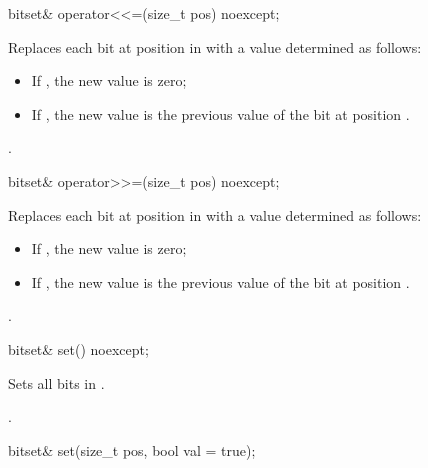 %
\begin{itemdecl}
bitset& operator<<=(size_t pos) noexcept;
\end{itemdecl}

\begin{itemdescr}
\pnum
\effects
Replaces each bit at position  in
with a value determined as follows:
\begin{itemize}
\item
If , the new value is zero;
\item
If , the new value is the previous
value of the bit at position .
\end{itemize}

\pnum
\returns
{}.
\end{itemdescr}

%
\begin{itemdecl}
bitset& operator>>=(size_t pos) noexcept;
\end{itemdecl}

\begin{itemdescr}
\pnum
\effects
Replaces each bit at position  in
with a value determined as follows:
\begin{itemize}
\item
If , the new value is zero;
\item
If , the new value is the previous value of the bit at position .
\end{itemize}

\pnum
\returns
{}.
\end{itemdescr}

%
%
\begin{itemdecl}
bitset& set() noexcept;
\end{itemdecl}

\begin{itemdescr}
\pnum
\effects
Sets all bits in
.

\pnum
\returns
{}.
\end{itemdescr}

%
%
\begin{itemdecl}
bitset& set(size_t pos, bool val = true);
\end{itemdecl}

